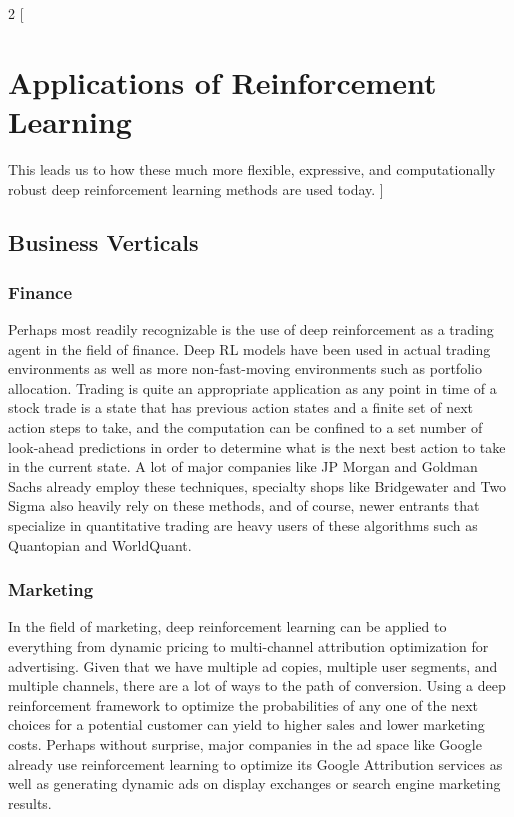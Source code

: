 \documentclass[a4paper,10pt]{extarticle}
\begin{document}
                        \begin{multicols}{2}
                        [
                        \section{Applications of Reinforcement Learning}
                        This leads us to how these much more flexible, expressive, and computationally robust deep reinforcement learning methods are used today. 
                        ]

                        \subsection{Business Verticals}

                        \subsubsection{Finance}
                        Perhaps most readily recognizable is the use of deep reinforcement as a trading agent in the field of finance. Deep RL models have been used in actual trading environments as well as more non-fast-moving environments such as portfolio allocation. Trading is quite an appropriate application as any point in time of a stock trade is a state that has previous action states and a finite set of next action steps to take, and the computation can be confined to a set number of look-ahead predictions in order to determine what is the next best action to take in the current state. A lot of major companies like JP Morgan and Goldman Sachs already employ these techniques, specialty shops like Bridgewater and Two Sigma also heavily rely on these methods, and of course, newer entrants that specialize in quantitative trading are heavy users of these algorithms such as Quantopian and WorldQuant.  

                        \subsubsection{Marketing}
                        In the field of marketing, deep reinforcement learning can be applied to everything from dynamic pricing to multi-channel attribution optimization for advertising. Given that we have multiple ad copies, multiple user segments, and multiple channels, there are a lot of ways to the path of conversion. Using a deep reinforcement framework to optimize the probabilities of any one of the next choices for a potential customer can yield to higher sales and lower marketing costs. Perhaps without surprise, major companies in the ad space like Google already use reinforcement learning to optimize its Google Attribution services as well as generating dynamic ads on display exchanges or search engine marketing results. 


\end{multicols}
\end{document}
